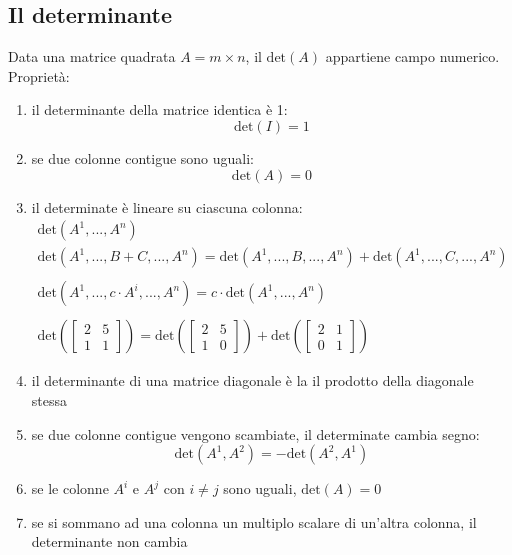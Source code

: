 \documentclass[italian]{article}
\renewcommand{\det}[1]{\text{det$\left(#1\right)$}}
\begin{document}
\newpage
\subsection{Il determinante}
Data una matrice quadrata $A = m\times n$, il $\det{A}$ appartiene campo numerico.
Proprietà:
\begin{enumerate}
	\item il determinante della matrice identica è 1:
			\[
				\det{I} = 1
			\]
	\item se due colonne contigue sono uguali:
			\[
				\det{A} = 0
			\]
	\item il determinate è lineare su ciascuna colonna:
			\begin{gather*}
				\det{A^1,...,A^n} \\
				\det{A^1,...,B+C,...,A^n} = \det{A^1,...,B,...,A^n} + \det{A^1,...,C,...,A^n} \\\\
				\det{A^1,...,c\cdot A^i,...,A^n} = c \cdot \det{A^1,...,A^n} \\\\
				\det{
					\begin{bmatrix}
						2 & 5 \\ 1 & 1
					\end{bmatrix}
				} =
				\det{
					\begin{bmatrix}
						2 & 5 \\ 1 & 0
					\end{bmatrix}
				}
				+
				\det{
					\begin{bmatrix}
						2 & 1 \\ 0 & 1
					\end{bmatrix}
				}
			\end{gather*}
	\item il determinante di una matrice diagonale è la il prodotto della diagonale stessa
	\item se due colonne contigue vengono scambiate, il determinate cambia segno:
			\[
				\det{A^1,A^2} = -\det{A^2,A^1}
			\]
	\item se le colonne $A^i$ e $A^j$ con $i\neq j$ sono uguali, $\det{A} = 0$
	\item se si sommano ad una colonna un multiplo scalare di un'altra colonna, il determinante non cambia
\end{enumerate}
\end{document}
